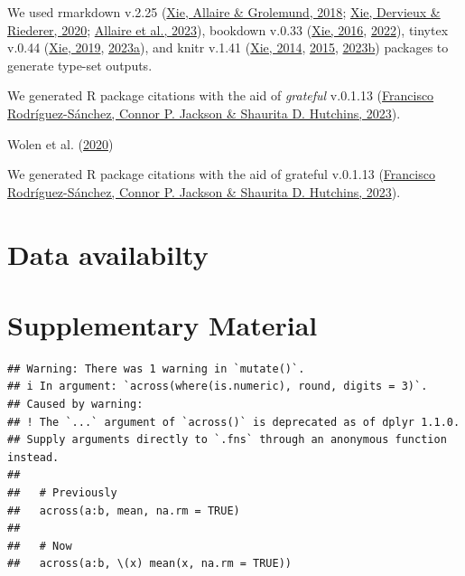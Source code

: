 \documentclass[10pt,a4paper]{article}
\begin{document}
We used rmarkdown v.2.25 (\protect\hyperlink{ref-rmarkdown2018}{Xie, Allaire \& Grolemund, 2018}; \protect\hyperlink{ref-rmarkdown2020}{Xie, Dervieux \& Riederer, 2020}; \protect\hyperlink{ref-rmarkdown2023}{Allaire et al., 2023}), bookdown v.0.33 (\protect\hyperlink{ref-bookdown2016}{Xie, 2016}, \protect\hyperlink{ref-R-bookdown}{2022}), tinytex v.0.44 (\protect\hyperlink{ref-tinytex2019}{Xie, 2019}, \protect\hyperlink{ref-tinytex2023}{2023a}), and knitr v.1.41 (\protect\hyperlink{ref-knitr2014}{Xie, 2014}, \protect\hyperlink{ref-knitr2015}{2015}, \protect\hyperlink{ref-knitr2023}{2023b}) packages to generate type-set outputs.

We generated R package citations with the aid of \emph{grateful} v.0.1.13 (\protect\hyperlink{ref-grateful}{Francisco Rodríguez-Sánchez, Connor P. Jackson \& Shaurita D. Hutchins, 2023}).

Wolen et al. (\protect\hyperlink{ref-osfr}{2020})

We generated R package citations with the aid of grateful v.0.1.13 (\protect\hyperlink{ref-grateful}{Francisco Rodríguez-Sánchez, Connor P. Jackson \& Shaurita D. Hutchins, 2023}).

\hypertarget{data-availabilty}{%
\section{Data availabilty}\label{data-availabilty}}

\hypertarget{supplementary-material}{%
\section{Supplementary Material}\label{supplementary-material}}

\begin{verbatim}
## Warning: There was 1 warning in `mutate()`.
## i In argument: `across(where(is.numeric), round, digits = 3)`.
## Caused by warning:
## ! The `...` argument of `across()` is deprecated as of dplyr 1.1.0.
## Supply arguments directly to `.fns` through an anonymous function instead.
## 
##   # Previously
##   across(a:b, mean, na.rm = TRUE)
## 
##   # Now
##   across(a:b, \(x) mean(x, na.rm = TRUE))
\end{verbatim}
\end{document}
